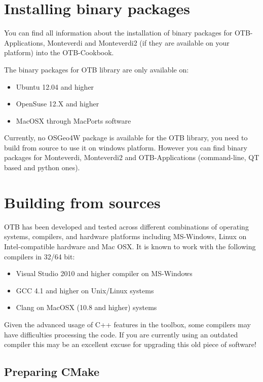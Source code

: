 \section{Installing binary packages}
\label{sec:install_binaries}

You can find all information about the installation of binary packages for OTB-Applications, Monteverdi and Monteverdi2 (if they are available on your platform) into the OTB-Cookbook.

The binary packages for OTB library are only available on:
\begin{itemize}
\item Ubuntu 12.04 and higher
\item OpenSuse 12.X and higher
\item MacOSX through MacPorts software  
\end{itemize}

Currently, no OSGeo4W package is available for the OTB library, you need to build from source to use it on windows platform. However you can find binary packages for Monteverdi, Monteverdi2 and OTB-Applications (command-line, QT based and python ones).


\section{Building from sources}
\label{sec:source}
OTB has been developed and tested across different combinations of operating systems, compilers, and hardware platforms including MS-Windows, Linux on Intel-compatible hardware and Mac OSX.  It is known to work with the following compilers in 32/64 bit:
\begin{itemize}
\item Visual Studio 2010 and higher compiler on MS-Windows
\item GCC 4.1 and higher on Unix/Linux systems
\item Clang on MacOSX (10.8 and higher) systems
\end{itemize}

Given the advanced usage of C++ features in the toolbox, some compilers may have difficulties processing the code. If you are currently using an outdated compiler this may be an excellent excuse for upgrading this old piece of software!

\subsection{Preparing CMake}
\label{sec:CMakeforOTB}

